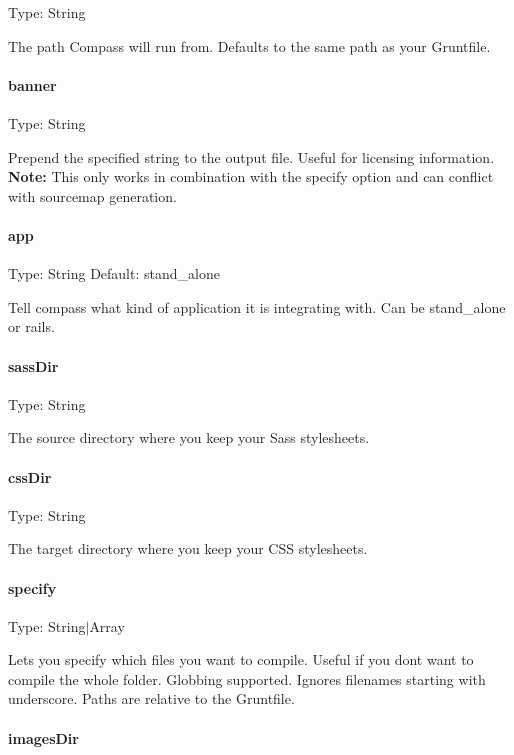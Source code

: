 Type\+: {\ttfamily String}

The path Compass will run from. Defaults to the same path as your Gruntfile.

\paragraph*{banner}

Type\+: {\ttfamily String}

Prepend the specified string to the output file. Useful for licensing information. {\bfseries Note\+:} This only works in combination with the {\ttfamily specify} option and can conflict with sourcemap generation.

\paragraph*{app}

Type\+: {\ttfamily String} Default\+: {\ttfamily stand\+\_\+alone}

Tell compass what kind of application it is integrating with. Can be {\ttfamily stand\+\_\+alone} or {\ttfamily rails}.

\paragraph*{sass\+Dir}

Type\+: {\ttfamily String}

The source directory where you keep your Sass stylesheets.

\paragraph*{css\+Dir}

Type\+: {\ttfamily String}

The target directory where you keep your C\+SS stylesheets.

\paragraph*{specify}

Type\+: {\ttfamily String$\vert$\+Array}

Lets you specify which files you want to compile. Useful if you don\textquotesingle{}t want to compile the whole folder. Globbing supported. Ignores filenames starting with underscore. Paths are relative to the Gruntfile.

\paragraph*{images\+Dir}


